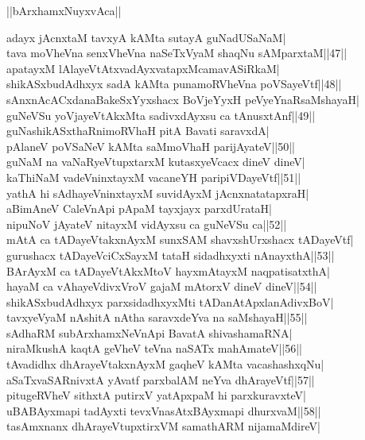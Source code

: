 \documentclass{article}
\begin{document}
\begin{center}
||bArxhamxNuyxvAca||
\end{center}

adayx jAcnxtaM tavxyA kAMta sutayA guNadUSaNaM|\\
tava moVheVna senxVheVna naSeTxVyaM shaqNu sAMparxtaM||47||\\
apatayxM lAlayeVtAtxvadAyxvatapxMcamavASiRkaM|\\
shikASxbudAdhxyx sadA kAMta punamoRVheVna poVSayeVtf||48||\\
sAnxnAcACxdanaBakeSxYyxshacx BoVjeYyxH peVyeYnaRsaMshayaH|\\
guNeVSu yoVjayeVtAkxMta sadivxdAyxsu ca tAnusxtAnf||49||\\
guNashikASxthaRnimoRVhaH pitA Bavati saravxdA|\\
pAlaneV poVSaNeV kAMta saMmoVhaH parijAyateV||50||\\
guNaM na vaNaRyeVtupxtarxM kutasxyeVcacx dineV dineV|\\
kaThiNaM vadeVninxtayxM vacaneYH paripiVDayeVtf||51||\\
yathA hi sAdhayeVninxtayxM suvidAyxM jAcnxnatatapxraH|\\
aBimAneV CaleVnApi pApaM tayxjayx parxdUrataH|\\
nipuNoV jAyateV nitayxM vidAyxsu ca guNeVSu ca||52||\\
mAtA ca tADayeVtakxnAyxM sunxSAM shavxshUrxshacx tADayeVtf|\\
gurushacx tADayeVciCxSayxM tataH sidadhxyxti nAnayxthA||53||\\
BArAyxM ca tADayeVtAkxMtoV hayxmAtayxM naqpatisatxthA|\\
hayaM ca vAhayeVdivxVroV gajaM mAtorxV dineV dineV||54||\\
shikASxbudAdhxyx parxsidadhxyxMti tADanAtApxlanAdivxBoV|\\
tavxyeVyaM nAshitA nAtha saravxdeYva na saMshayaH||55||\\
sAdhaRM subArxhamxNeVnApi BavatA shivashamaRNA|\\
niraMkushA kaqtA geVheV teVna naSATx mahAmateV||56||\\
tAvadidhx dhArayeVtakxnAyxM gaqheV kAMta vacashashxqNu|\\
aSaTxvaSARnivxtA yAvatf parxbalAM neYva dhArayeVtf||57||\\
pitugeRVheV sithxtA putirxV yatApxpaM hi parxkuravxteV|\\
uBABAyxmapi tadAyxti tevxVnasAtxBAyxmapi dhurxvaM||58||\\
tasAmxnanx dhArayeVtupxtirxVM samathARM nijamaMdireV|\\
\end{document}
